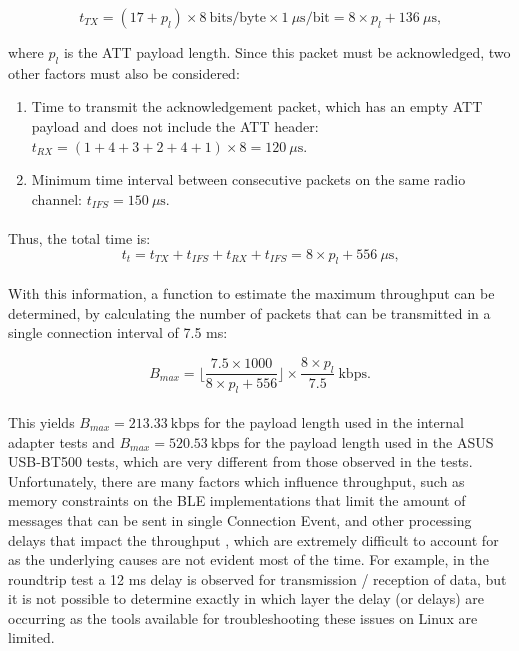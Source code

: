 \begin{equation}
    t_{TX} = (17 + p_{l}) \times 8\ \text{bits/byte} \times 1\ \mu\text{s}/\text{bit} = 8\times p_l + 136\ \mu\text{s,}
\end{equation}

where $p_{l}$ is the \acs{ATT} payload length. Since this packet must be acknowledged, two other factors must also be considered: 

\begin{enumerate}
    \item Time to transmit the acknowledgement packet, which has an empty \acs{ATT} payload and does not include the \acs{ATT} header: $t_{RX} = (1+4+3+2+4+1)\times 8 = 120\ \mu\text{s}$.
    \item Minimum time interval between consecutive packets on the same radio channel: $t_{IFS} = 150\ \mu\text{s}$.
\end{enumerate}

\paragraph{} Thus, the total time is:
\begin{equation}
    t_{t} = t_{TX}+ t_{IFS}+ t_{RX} + t_{IFS} =  8\times p_l  + 556\ \mu\text{s,}
\end{equation}

\paragraph{} With this information, a function to estimate the maximum throughput can be determined, by calculating the number of packets that can be transmitted in a single connection interval of 7.5 ms:

\begin{equation}
    B_{max} = \bigg\lfloor \frac{7.5\times 1000}{8\times p_l  + 556} \bigg\rfloor\times \frac{8\times p_l}{7.5}\ \text{kbps.}
\end{equation}

\paragraph{} This yields $B_{max}=213.33\ \text{kbps}$ for the payload length used in the internal adapter tests and $B_{max}=520.53\ \text{kbps}$ for the payload length used in the ASUS USB-BT500 tests, which are very different from those observed in the tests. Unfortunately, there are many factors which influence throughput, such as memory constraints on the \acs{BLE} implementations that limit the amount of messages that can be sent in single Connection Event, and other processing delays that impact the throughput \cite{Gomez2012}, which are extremely difficult to account for as the underlying causes are not evident most of the time. For example, in the roundtrip test a 12 ms delay is observed for transmission / reception of data, but it is not possible to determine exactly in which layer the delay (or delays) are occurring as the tools available for troubleshooting these issues on Linux are limited.

